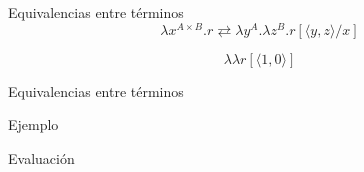 \begin{frame}{Equivalencias entre términos}	
	\[ \lambda x^{A \times B}. r \rightleftarrows \lambda y^A. \lambda z^B. r[\langle y, z \rangle/x] \]

	\pause
	\[ \lambda \lambda r[\langle 1,0 \rangle] \]
	
	\pause
	
	\pause
	
\end{frame}

\begin{frame}{Equivalencias entre términos}	
\end{frame}

\begin{frame}{Ejemplo}
	\pause
\end{frame}

\begin{frame}{Evaluación}
\end{frame}


